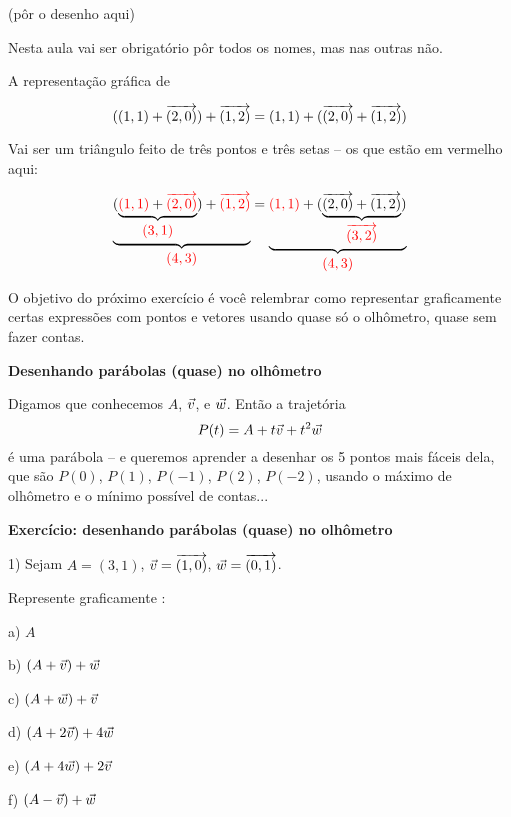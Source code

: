 \documentclass[oneside,12pt]{article}
\begin{document}
\msk

(pôr o desenho aqui)

\msk

Nesta aula vai ser obrigatório pôr todos os nomes, mas nas outras não.

\newpage

A representação gráfica de

\def\und#1#2{\underbrace{#1}_{\textstyle#2}}
\def\Red#1{\ColorRed{#1}}

$$((1,1) + {\overrightarrow{(2,0)}}) + {\overrightarrow{(1,2)}} = (1,1) + ({\overrightarrow{(2,0)}} + {\overrightarrow{(1,2)}})$$

Vai ser um triângulo feito de três pontos e três setas -- os que estão
em vermelho aqui:

$$\und{(\und{\Red{(1,1)} + \Red{\VEC{2,0}}}{\Red{(3,1)}}) + \Red{\VEC{1,2}}}{\Red{(4,3)}} =
  \und{\Red{(1,1)} + (\und{\VEC{2,0} + \VEC{1,2}}{\Red{\VEC{3,2}}})}{\Red{(4,3)}}
$$

O objetivo do próximo exercício é você relembrar como representar
graficamente certas expressões com pontos e vetores usando quase só o
olhômetro, quase sem fazer contas.


\newpage

{\bf Desenhando parábolas (quase) no olhômetro}

Digamos que conhecemos $A$, ${\vec v}$, e ${\vec w}$. Então a trajetória
%
$$P(t) = A + t{\vec v} + t^2{\vec w}$$
%
é uma parábola -- e queremos aprender a desenhar os 5 pontos mais
fáceis dela, que são $P(0)$, $P(1)$, $P(-1)$, $P(2)$, $P(-2)$, usando
o máximo de olhômetro e o mínimo possível de contas...

\msk



\newpage


{\bf Exercício: desenhando parábolas (quase) no olhômetro}

1) Sejam $A=(3,1)$, ${\vec v} = {\overrightarrow{(1,0)}}$, ${\vec w} = {\overrightarrow{(0,1)}}$.

Represente graficamente :

a) $A$

b) $(A+{\vec v})+{\vec w}$

c) $(A+{\vec w})+{\vec v}$

d) $(A+2{\vec v})+4{\vec w}$

e) $(A+4{\vec w})+2{\vec v}$

f) $(A-{\vec v})+{\vec w}$
\end{document}
